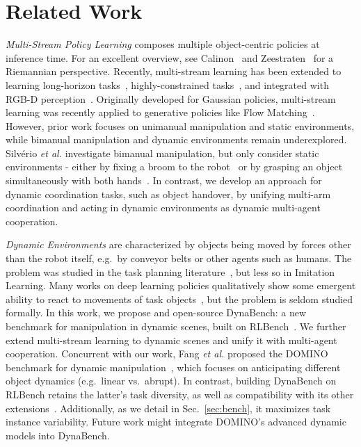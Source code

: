 \documentclass[letterpaper, 10 pt, journal, twoside]{IEEEtran}
\renewcommand{\secref}[1]{Sec.~\ref{#1}}
\newcommand{\etal}{\emph{et al.}}
\newcommand{\para}[1]{\parskip=5pt\noindent\textit{#1}}
\newcommand{\ourbench}{DynaBench\xspace}
\begin{document}
\section{Related Work}
\para{Multi-Stream Policy Learning} composes multiple object-centric policies at inference time.
%
%
For an excellent overview, see Calinon~\cite{calinon2016tutorial} and Zeestraten~\cite {zeestraten2018programming} for a Riemannian perspective.
Recently, multi-stream learning has been extended to learning long-horizon tasks~\cite{rozo2020learning, von2024art}, highly-constrained tasks~\cite{von2025unreasonable}, and integrated with RGB-D perception~\cite{von2024art, von2025unreasonable}.
%
Originally developed for Gaussian policies, multi-stream learning was recently applied to generative policies like Flow Matching~\cite{von2026msg}.
However, prior work focuses on unimanual manipulation and static environments, while bimanual manipulation and dynamic environments remain underexplored.
%
%
Silv{\'e}rio \etal{} investigate bimanual manipulation, but only consider static environments - either by fixing a broom to the robot~\cite{silverio2015learning} or by grasping an object simultaneously with both hands~\cite{silverio2018learning}.
In contrast, we develop an approach for dynamic coordination tasks, such as object handover, by unifying multi-arm coordination and acting in dynamic environments as dynamic multi-agent cooperation.

%
%
%
\para{Dynamic Environments} are characterized by objects being moved by forces other than the robot itself, e.g.\ by conveyor belts or other agents such as humans.
%
The problem was studied in the task planning literature~\cite{schmitt2019modeling}, but less so in Imitation Learning.
Many works on deep learning policies qualitatively show some emergent ability to react to movements of task objects~\cite{vonhartz2023treachery, chi2023diffusionpolicy}, but the problem is seldom studied formally.
In this work, we propose and open-source \ourbench: a new benchmark for manipulation in dynamic scenes, built on RLBench~\cite{james2019rlbench}.
We further extend multi-stream learning to dynamic scenes and unify it with multi-agent cooperation.
%
%
Concurrent with our work, Fang \etal{} proposed the DOMINO benchmark for dynamic manipulation~\cite{fang2026towards}, which focuses on anticipating different object dynamics (e.g.\ linear vs.\ abrupt).
In contrast, building \ourbench on RLBench retains the latter's task diversity, as well as compatibility with its other extensions~\cite{grotz2024peract2, pumacay2024colosseum, zheng2022vlmbench, huang2026robostream}.
Additionally, as we detail in \secref{sec:bench}, it maximizes task instance variability.
Future work might integrate DOMINO's advanced dynamic models into \ourbench.
\end{document}
